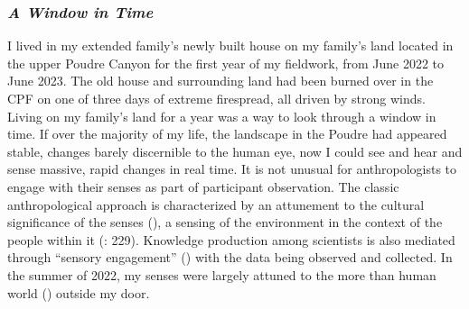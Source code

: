 \documentclass[
]{article}
\begin{document}
\subsubsection{\texorpdfstring{\emph{A Window in Time}}{A Window in Time}}\label{a-window-in-time}

I lived in my extended family's newly built house on my family's land located in the upper Poudre Canyon for the first year of my fieldwork, from June 2022 to June 2023. The old house and surrounding land had been burned over in the CPF on one of three days of extreme firespread, all driven by strong winds. Living on my family's land for a year was a way to look through a window in time. If over the majority of my life, the landscape in the Poudre had appeared stable, changes barely discernible to the human eye, now I could see and hear and sense massive, rapid changes in real time. It is not unusual for anthropologists to engage with their senses as part of participant observation. The classic anthropological approach is characterized by an attunement to the cultural significance of the senses (), a sensing of the environment in the context of the people within it (: 229). Knowledge production among scientists is also mediated through ``sensory engagement'' () with the data being observed and collected. In the summer of 2022, my senses were largely attuned to the more than human world () outside my door.
\end{document}
